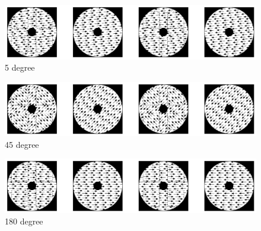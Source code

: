 \documentclass[landscape,final,paperwidth=72in,paperheight=42in,fontscale=0.285]{baposter}
\begin{document}
\begin{poster}
{%

\begin{figure}[H]
  \centering
  \includegraphics[scale=0.3]{img/mofo-child-tuning-dir5.jpg}
  \caption{5 degree}
\end{figure}

\begin{figure}[H]
  \centering
  \includegraphics[scale=0.3]{img/mofo-child-tuning-dir45.jpg}
  \caption{45 degree}\label{mofo-child-tuning-dir45.jpg}
\end{figure}

\begin{figure}[H]
  \centering
  \includegraphics[scale=0.3]{img/mofo-child-tuning-dir180.jpg}
  \caption{180 degree}\label{mofo-child-tuning-dir180.jpg}
\end{figure}      
      \vspace{2em}
    }


\end{poster}
\end{document}
